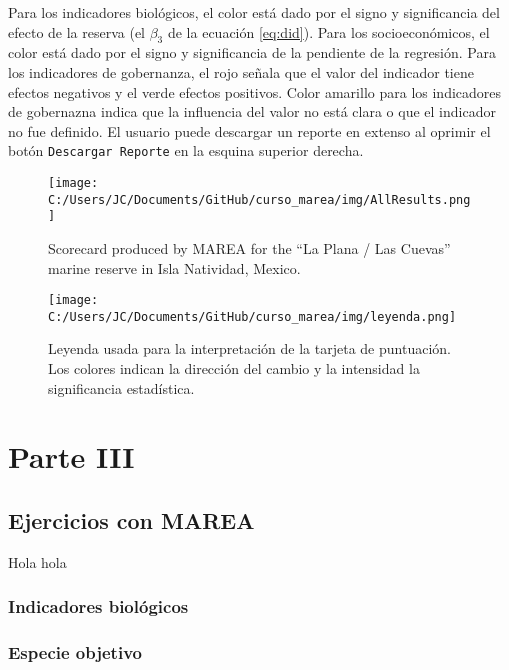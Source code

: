 \documentclass[]{krantz}
\begin{document}
Para los indicadores biológicos, el color está dado por el signo y
significancia del efecto de la reserva (el \(\beta_3\) de la ecuación
\eqref{eq:did}). Para los socioeconómicos, el color está dado por el signo
y significancia de la pendiente de la regresión. Para los indicadores de
gobernanza, el rojo señala que el valor del indicador tiene efectos
negativos y el verde efectos positivos. Color amarillo para los
indicadores de gobernazna indica que la influencia del valor no está
clara o que el indicador no fue definido. El usuario puede descargar un
reporte en extenso al oprimir el botón \texttt{Descargar\ Reporte} en la
esquina superior derecha.

\begin{figure}
\centering
\texttt{[image: C:/Users/JC/Documents/GitHub/curso\_marea/img/AllResults.png]}
\caption{\label{fig:resultados}Scorecard produced by MAREA for the ``La
Plana / Las Cuevas'' marine reserve in Isla Natividad, Mexico.}
\end{figure}

\begin{figure}
\centering
\texttt{[image: C:/Users/JC/Documents/GitHub/curso\_marea/img/leyenda.png]}
\caption{\label{fig:leyenda}Leyenda usada para la interpretación de la
tarjeta de puntuación. Los colores indican la dirección del cambio y la
intensidad la significancia estadística.}
\end{figure}

\hypertarget{part-parte-iii}{%
\part{Parte III}\label{part-parte-iii}}

\hypertarget{ejercicios-con-marea}{%
\chapter{Ejercicios con MAREA}\label{ejercicios-con-marea}}

Hola hola

\hypertarget{indicadores-biologicos}{%
\section{Indicadores biológicos}\label{indicadores-biologicos}}

\hypertarget{especie-objetivo}{%
\section{Especie objetivo}\label{especie-objetivo}}
\end{document}
